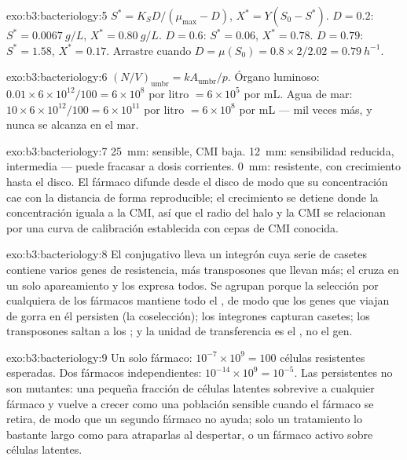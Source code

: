 \begin{solution}{exo:b3:bacteriology:5}
$S^{*} = K_{S}D/(\mu_{\max} - D)$, $X^{*} = Y(S_{0} - S^{*})$. $D = 0.2$:
$S^{*} = \qty{0.0067}{g/L}$, $X^{*} = \qty{0.80}{g/L}$. $D = 0.6$:
$S^{*} = 0.06$, $X^{*} = 0.78$. $D = 0.79$: $S^{*} = 1.58$, $X^{*} = 0.17$.
Arrastre cuando $D = \mu(S_{0}) = 0.8\times 2/2.02 = \qty{0.79}{h^{-1}}$.
\end{solution}

\begin{solution}{exo:b3:bacteriology:6}
$(N/V)_{\text{umbr}} = kA_{\text{umbr}}/p$. Órgano luminoso: $0.01\times
6\times 10^{12}/100 = 6\times 10^{8}$ por litro $= 6\times 10^{5}$ por
mL. Agua de mar: $10\times 6\times 10^{12}/100 = 6\times 10^{11}$ por
litro $= 6\times 10^{8}$ por mL --- mil veces más, y nunca se alcanza en
el mar.
\end{solution}

\begin{solution}{exo:b3:bacteriology:7}
\qty{25}{mm}: sensible, CMI baja. \qty{12}{mm}: sensibilidad reducida,
intermedia --- puede fracasar a dosis corrientes. \qty{0}{mm}:
resistente, con crecimiento hasta el disco. El fármaco difunde desde el
disco de modo que su concentración cae con la distancia de forma
reproducible; el crecimiento se detiene donde la concentración iguala a
la CMI, así que el radio del halo y la CMI se relacionan por una curva de
calibración establecida con cepas de CMI conocida.
\end{solution}

\begin{solution}{exo:b3:bacteriology:8}
El  conjugativo lleva un integrón cuya serie de casetes contiene
varios genes de resistencia, más transposones que llevan más; el 
cruza en un solo apareamiento y los expresa todos. Se agrupan porque la
selección por cualquiera de los fármacos mantiene todo el , de
modo que los genes que viajan de gorra en él persisten (la
coselección); los integrones capturan casetes; los transposones saltan a
los ; y la unidad de transferencia es el , no el gen.
\end{solution}

\begin{solution}{exo:b3:bacteriology:9}
Un solo fármaco: $10^{-7}\times 10^{9} = 100$ células resistentes
esperadas. Dos fármacos independientes:
$10^{-14}\times 10^{9} = 10^{-5}$. Las persistentes no son mutantes: una
pequeña fracción de células latentes sobrevive a cualquier fármaco y
vuelve a crecer como una población sensible cuando el fármaco se retira,
de modo que un segundo fármaco no ayuda; solo un tratamiento lo bastante
largo como para atraparlas al despertar, o un fármaco activo sobre
células latentes.
\end{solution}

